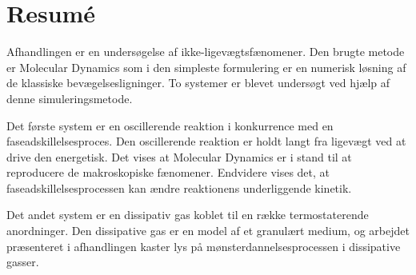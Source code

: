 
\chapter*{Resum\'{e}}

Afhandlingen er en unders{\o}gelse af ikke-ligev{\ae}gtsf{\ae}nomener.
Den brugte metode er Molecular Dynamics som i den simpleste formulering
er en numerisk l{\o}sning af de klassiske bev{\ae}gelsesligninger. To
systemer er blevet unders{\o}gt ved hj{\ae}lp af denne
simuleringsmetode.

Det f{\o}rste system er en oscillerende reaktion i konkurrence med en
faseadskillelsesproces. Den oscillerende reaktion er holdt langt fra
ligev{\ae}gt ved at drive den energetisk. Det vises at Molecular
Dynamics er i stand til at reproducere de makroskopiske f{\ae}nomener.
Endvidere vises det, at faseadskillelsesprocessen kan {\ae}ndre
reaktionens underliggende kinetik.

Det andet system er en dissipativ gas koblet til en r{\ae}kke
termostaterende anordninger. Den dissipative gas er en model af et
granul{\ae}rt medium, og arbejdet pr{\ae}senteret i afhandlingen kaster
lys p{\aa} m{\o}nsterdannelsesprocessen i dissipative gasser.